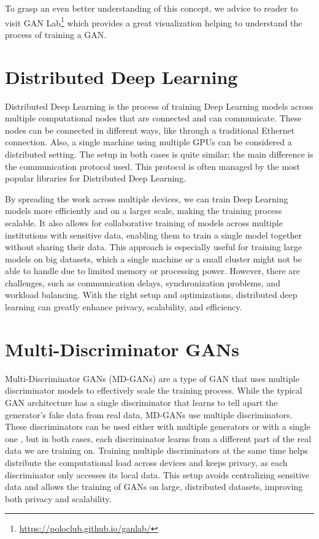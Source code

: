 To grasp an even better understanding of this concept, we advice to reader to visit GAN Lab\footnote{\url{https://poloclub.github.io/ganlab/}} \cite{Kahng_2019} which provides a great visualization helping to understand the process of training a GAN.


\section{Distributed Deep Learning}
Distributed Deep Learning is the process of training Deep Learning models across multiple computational nodes that are connected and can communicate. These nodes can be connected in different ways, like through a traditional Ethernet connection. Also, a single machine using multiple GPUs can be considered a distributed setting. The setup in both cases is quite similar; the main difference is the communication protocol used. This protocol is often managed by the most popular libraries for Distributed Deep Learning.


By spreading the work across multiple devices, we can train Deep Learning models more efficiently and on a larger scale, making the training process scalable. It also allows for collaborative training of models across multiple institutions with sensitive data, enabling them to train a single model together without sharing their data. This approach is especially useful for training large models on big datasets, which a single machine or a small cluster might not be able to handle due to limited memory or processing power. However, there are challenges, such as communication delays, synchronization problems, and workload balancing. With the right setup and optimizations, distributed deep learning can greatly enhance privacy, scalability, and efficiency.



\section{Multi-Discriminator GANs}
Multi-Discriminator GANs (MD-GANs) are a type of GAN that uses multiple discriminator models to effectively scale the training process. While the typical GAN architecture has a single discriminator that learns to tell apart the generator's fake data from real data, MD-GANs use multiple discriminators. These discriminators can be used either with multiple generators \cite{fedgan} or with a single one \cite{mdgan}, but in both cases, each discriminator learns from a different part of the real data we are training on. Training multiple discriminators at the same time helps distribute the computational load across devices and keeps privacy, as each discriminator only accesses its local data. This setup avoids centralizing sensitive data and allows the training of GANs on large, distributed datasets, improving both privacy and scalability.
